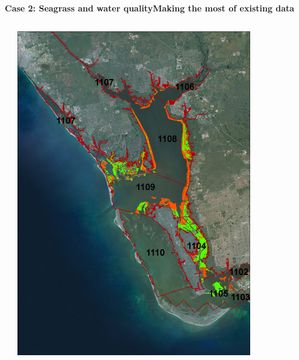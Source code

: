 \documentclass[serif]{beamer}\usepackage[]{graphicx}\usepackage[]{color}
\newenvironment{knitrout}{}{} %
\begin{document}
\begin{frame}{\textbf{Case 2: Seagrass and water quality}}{\textbf{Making the most of existing data}}
\begin{columns}[T]
\begin{column}{0.5\textwidth}
\begin{knitrout}
{}



\end{knitrout}
\end{column}
\begin{column}{0.45\textwidth}
\centerline{\includegraphics[width = 0.8\textwidth]{fig/Charlotte_Estuary_Segments.jpg}}
\end{column}
\end{columns}
\end{frame}
\end{document}

